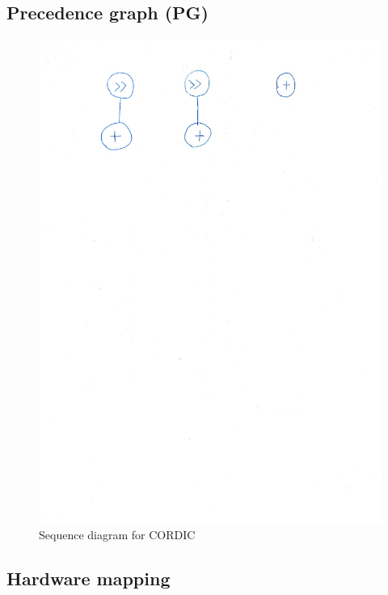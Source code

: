\documentclass[12pt, a4paper,oneside]{article}
\begin{document}
\subsection{Precedence graph (PG)}
\begin{figure}[H]
	\centering
	\includegraphics[width = \linewidth,trim=0 23cm 0 0]{sequencediagram.pdf}
	\caption{Sequence diagram for CORDIC}
	\label{fig:cordic_sd}
\end{figure}

\subsection{Hardware mapping}
\end{document}
